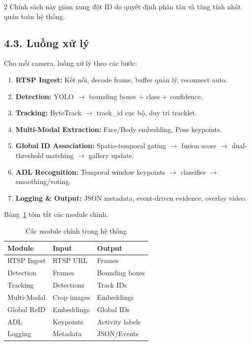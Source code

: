 \documentclass[a4paper,13pt]{article}
\begin{document}
\begin{multicols}{2}
Chính sách này giảm xung đột ID do quyết định phân tán và tăng tính nhất quán toàn hệ thống.

\subsection*{4.3. Luồng xử lý}
Cho mỗi camera, luồng xử lý theo các bước:
\begin{enumerate}
    \item \textbf{RTSP Ingest:} Kết nối, decode frame, buffer quản lý, reconnect auto.
    \item \textbf{Detection:} YOLO $\to$ bounding boxes + class + confidence.
    \item \textbf{Tracking:} ByteTrack $\to$ track\_id cục bộ, duy trì tracklet.
    \item \textbf{Multi-Modal Extraction:} Face/Body embedding, Pose keypoints.
    \item \textbf{Global ID Association:} Spatio-temporal gating $\to$ fusion score $\to$ dual-threshold matching $\to$ gallery update.
    \item \textbf{ADL Recognition:} Temporal window keypoints $\to$ classifier $\to$ smoothing/voting.
    \item \textbf{Logging \& Output:} JSON metadata, event-driven evidence, overlay video.
\end{enumerate}

Bảng~\ref{tab:modules} tóm tắt các module chính.

\begin{table}[H]
\centering
\caption{Các module chính trong hệ thống}
\label{tab:modules}
\fontsize{11}{13}\selectfont
\renewcommand{\arraystretch}{1.3}
\begin{tabular}{lll}
\toprule
\textbf{Module} & \textbf{Input} & \textbf{Output} \\
\midrule
RTSP Ingest & RTSP URL & Frames \\
Detection & Frames & Bounding boxes \\
Tracking & Detections & Track IDs \\
Multi-Modal & Crop images & Embeddings \\
Global ReID & Embeddings & Global IDs \\
ADL & Keypoints & Activity labels \\
Logging & Metadata & JSON/Events \\
\bottomrule
\end{tabular}
\end{table}


\end{multicols}
\end{document}
